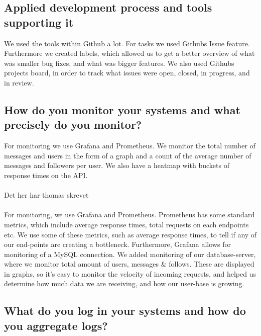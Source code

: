 \documentclass{article}
\begin{document}
\subsection{Applied development process and tools supporting it}
We used the tools within Github a lot. For tasks we used Githubs Issue feature. Furthermore we created labels, which allowed us to get a better overview of what was smaller bug fixes, and what was bigger features. We also used Githubs projects board, in order to track what issues were open, closed, in progress, and in review.

\subsection{How do you monitor your systems and what precisely do you monitor?}
For monitoring we use Grafana and Prometheus. We monitor the total number of messages and users in the form of a graph and a count of the average number of messages and followers per user. We also have a heatmap with buckets of response times on the API.\\\\

Det her har thomas skrevet \\\\
For monitoring, we use Grafana and Prometheus. Prometheus has some standard metrics, which include average response times, total requests on each endpoints etc. We use some of these metrics, such as average response times, to tell if any of our end-points are creating a bottleneck. Furthermore, Grafana allows for monitoring of a MySQL connection. We added monitoring of our database-server, where we monitor total amount of users, messages \& follows. These are displayed in graphs, so it's easy to monitor the velocity of incoming requests, and helped us determine how much data we are receiving, and how our user-base is growing.

\subsection{What do you log in your systems and how do you aggregate logs?}
\end{document}
